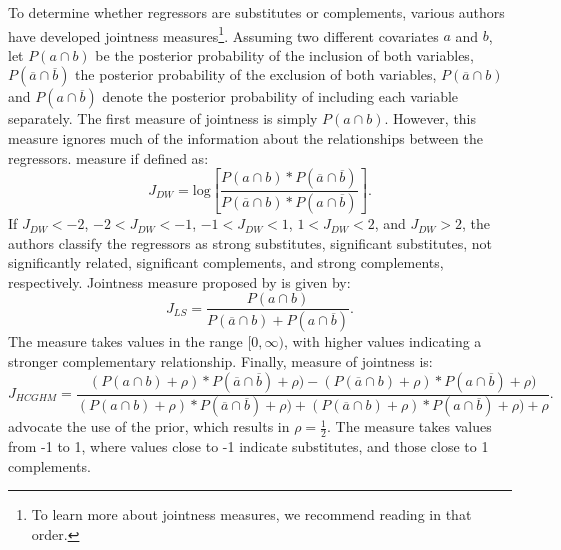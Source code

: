 \documentclass[a4paper]{article}
\begin{document}
\indent To determine whether regressors are substitutes or complements, various authors have developed jointness measures\footnote{To learn more about jointness measures, we recommend reading \citet{Doppelhofer+2009, Ley+2007, Hofmarcher+2018} in that order.}.
Assuming two different covariates $a$ and $b$, let $P(a\cap b)$ be the posterior probability of the inclusion of both variables, $P(\overline{a}\cap \overline{b})$ the posterior probability of the exclusion of both variables, $P(\overline{a}\cap b)$ and $P(a\cap \overline{b})$ denote the posterior probability of including each variable separately.
The first measure of jointness is simply $P(a\cap b)$.
However, this measure ignores much of the information about the relationships between the regressors.
\citet{Doppelhofer+2009} measure if defined as:
\begin{equation}
    J_{DW}=\text{log}\left[\frac{P(a\cap b)*P(\overline{a}\cap \overline{b})}{P(\overline{a}\cap b)*P(a\cap \overline{b})}\right].
\end{equation}
If $J_{DW} < -2$, $-2 < J_{DW} < -1$, $-1 < J_{DW} < 1$, $1 < J_{DW} < 2$, and $J_{DW} > 2$, the authors classify the regressors as strong substitutes, significant substitutes, not significantly related, significant complements, and strong complements, respectively.
Jointness measure proposed by \citet{Ley+2007} is given by:
\begin{equation}
    J_{LS}=\frac{P(a\cap b)}{P(\overline{a}\cap b)+P(a\cap \overline{b})}.
\end{equation}
The measure takes values in the range $[0, \infty)$, with higher values indicating a stronger complementary relationship.
Finally, \citet{Hofmarcher+2018} measure of jointness is:
\begin{equation}
    J_{HCGHM}=\frac{(P(a\cap b)+\rho)*P(\overline{a}\cap \overline{b})+\rho)-(P(\overline{a}\cap b)+\rho)*P(a\cap \overline{b})+\rho)}{(P(a\cap b)+\rho)*P(\overline{a}\cap \overline{b})+\rho)+(P(\overline{a}\cap b)+\rho)*P(a\cap \overline{b})+\rho)+\rho}.
\end{equation}
\citet{Hofmarcher+2018} advocate the use of the \citet{Jeffreys+1946} prior, which results in $\rho=\frac{1}{2}$.
The measure takes values from -1 to 1, where values close to -1 indicate substitutes, and those close to 1 complements.
\end{document}
